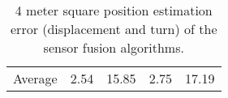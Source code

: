\begin{table}[H]
\begin{center}
{\begin{tabular}[t]{lcccc}
                \hline
                Average          & 2.54                    & 15.85                  & 2.75            & 17.19
            \end{tabular}
        }
        \caption{4 meter square position estimation error (displacement and turn) of the sensor fusion algorithms. }
        \label{tab:4_square}
    \end{center}
\end{table}